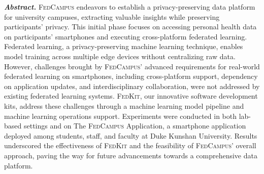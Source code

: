 \documentclass[11pt,a4paper,oneside]{report}
\newcommand{\fedcampus}{\textsc{FedCampus}\xspace}
\newcommand{\fedkit}{\textsc{FedKit}\xspace}
\begin{document}
\emph{\textbf{Abstract.}}
\fedcampus endeavors to establish a privacy-preserving data platform for
university campuses,
extracting valuable insights while preserving participants' privacy.
This initial phase focuses on accessing personal health data on participants'
smartphones and executing cross-platform federated learning. Federated learning,
a privacy-preserving machine learning technique,
enables model training across multiple edge devices without centralizing raw
data. However,
challenges brought by \fedcampus' advanced requirements for real-world federated
learning on smartphones, including cross-platform support,
dependency on application updates, and interdisciplinary collaboration,
were not addressed by existing federated learning systems. \fedkit,
our innovative software development kits,
address these challenges through a machine learning model pipeline and machine
learning operations support.
Experiments were conducted in both lab-based settings and on The \fedcampus
Application, a smartphone application deployed among students, staff,
and faculty at Duke Kunshan University.
Results underscored the effectiveness of \fedkit and the feasibility of
\fedcampus' overall approach,
paving the way for future advancements towards a comprehensive data platform.

\vspace{4\bigskipamount}
\end{document}
